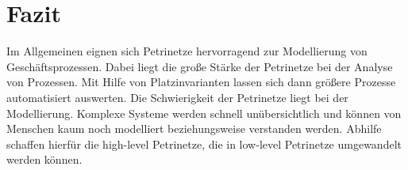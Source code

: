 \chapter{Fazit}
Im Allgemeinen eignen sich Petrinetze hervorragend zur Modellierung von Geschäftsprozessen.
Dabei liegt die große Stärke der Petrinetze bei der Analyse von Prozessen.
Mit Hilfe von Platzinvarianten lassen sich dann größere Prozesse automatisiert auswerten.
Die Schwierigkeit der Petrinetze liegt bei der Modellierung.
Komplexe Systeme werden schnell unübersichtlich und können von Menschen kaum noch modelliert beziehungsweise verstanden werden.
Abhilfe schaffen hierfür die high-level Petrinetze, die in low-level Petrinetze umgewandelt werden können.

